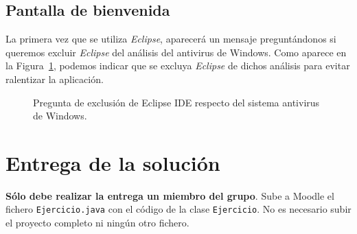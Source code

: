 \documentclass[
  spanish,
  11pt,
  a4paper,
  DIV=11,
  numbers=noendperiod]{scrartcl}
\begin{document}
\subsection{Pantalla de bienvenida}\label{pantalla-de-bienvenida-1}

La primera vez que se utiliza \emph{Eclipse}, aparecerá un mensaje preguntándonos si queremos excluir \emph{Eclipse} del análisis del antivirus de Windows. Como aparece en la Figura~\ref{fig-antivirus_eclipse}, podemos indicar que se excluya \emph{Eclipse} de dichos análisis para evitar ralentizar la aplicación.

\begin{figure}
\caption{Pregunta de exclusión de Eclipse IDE respecto del sistema antivirus de Windows.}\label{fig-antivirus_eclipse}
\end{figure}

\section{Entrega de la solución}\label{entrega-de-la-soluciuxf3n}

\textbf{Sólo debe realizar la entrega un miembro del grupo}. Sube a Moodle el fichero \texttt{Ejercicio.java} con el código de la clase \texttt{Ejercicio}. No es necesario subir el proyecto completo ni ningún otro fichero.
\end{document}
